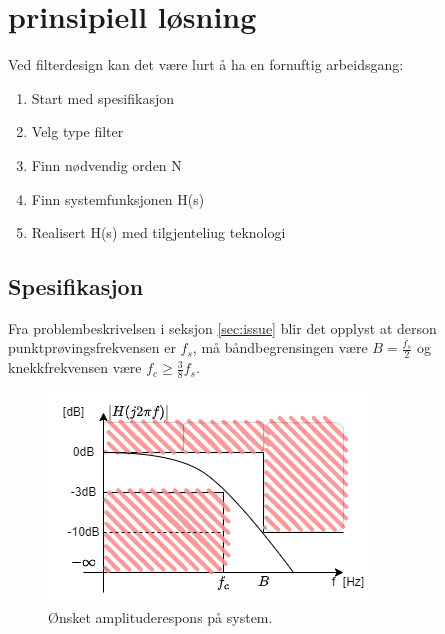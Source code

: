 \section{prinsipiell løsning}
\label{sec:concept}

Ved filterdesign kan det være lurt å ha en fornuftig arbeidsgang:
\begin{enumerate}
    \item Start med spesifikasjon
    \item Velg type filter
    \item Finn nødvendig orden N
    \item Finn systemfunksjonen H(s)
    \item Realisert H(s) med tilgjenteliug teknologi
  \end{enumerate}

\subsection{Spesifikasjon}
\label{sec:spesifikasjon}
Fra problembeskrivelsen i seksjon \ref{sec:issue} blir det opplyst at derson punktprøvingsfrekvensen er $f_s$, må båndbegrensingen være $B=\frac {f_s} {2}$ og knekkfrekvensen være $f_c \geq \frac{3}{8}f_s$.

\begin{figure}[!hbt]
	\centering
	\includegraphics[scale=0.7]{./Images/02Concept/01spesifikasjon.png}
	\caption{Ønsket amplituderespons på system.}
	\label{fig:02ønsketamplituderespons}
\end{figure}
